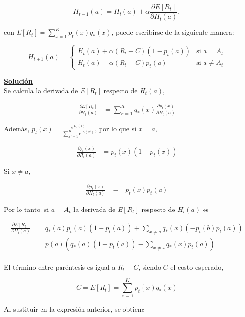 \documentclass[12pt]{article}
\newlength\tindent
\renewcommand{\indent}{\hspace*{\tindent}}
\begin{document}
    \[
        H_{t+1}(a) = H_t (a) + \alpha \frac{\partial E[R_t] }{\partial H_t(a)},
    \]

    con $E[R_t] = \sum_{x=1}^{K} p_t(x)q_{*}(x)$, puede escribirse de la siguiente manera:

    \[
        H_{t+1}(a) =
        \begin{cases}
            H_t (a) + \alpha (R_t - C)(1-p_t(a))    &\text{si $a = A_t$} \\
            H_t (a) - \alpha (R_t - C)p_t(a)        &\text{si $a \neq A_t$}
        \end{cases}
    \]

    \indent\underline{\textbf{Solución}}\\
    Se calcula la derivada de $E[R_t]$ respecto de $H_t(a)$,

    \begin{align*}
        \frac{\partial E[R_t]}{\partial H_t(a)} &= \sum_{x=1}^{K} q_{*}(x) \frac{\partial p_t(x)}{\partial H_t(a)}
    \end{align*}

    Además, $p_t(x) = \frac{e^{H_t(x)}}{\sum_{x'=1}^{K} e^{H_t(x')}}$, por lo que si $x=a$,

    \begin{align*}
        \frac{\partial p_t(x)}{\partial H_t(a)} &= p_t(x)(1-p_t(x))
    \end{align*}

    Si $x\neq a$,

    \begin{align*}
        \frac{\partial p_t(x)}{\partial H_t(a)} &= -p_t(x)p_t(a)
    \end{align*}

    Por lo tanto, si $a=A_t$ la derivada de $E[R_t]$ respecto de $H_t(a)$ es

    \begin{align*}
        \frac{\partial E[R_t]}{\partial H_t(a)} &= q_{*}(a)p_t(a)(1-p_t(a)) + \sum_{x\neq a} q_{*}(x)(-p_t(b)p_t(a)) \\
        &= p(a)\left( q_{*}(a)(1-p_t(a)) - \sum_{x\neq a} q_{*}(x)p_t(a) \right) \\
    \end{align*}

    El término entre paréntesis es igual a $R_t - C$, siendo $C$ el costo esperado,

    \[
        C = E[R_t] = \sum_{x=1}^{K} p_t(x)q_{*}(x)
    \]

    Al sustituir en la expresión anterior, se obtiene
\end{document}
